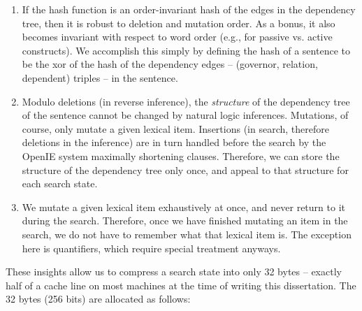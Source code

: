 \begin{enumerate}
  \item If the hash function is an order-invariant hash of the edges in the dependency tree,
        then it is robust to deletion and mutation order.
        As a bonus, it also becomes invariant with respect to word order (e.g., for passive vs. active
        constructs).
        We accomplish this simply by defining the hash of a sentence to be the xor of the hash of
        the dependency edges -- (governor, relation, dependent) triples -- in the sentence.

  \item Modulo deletions (in reverse inference), the \textit{structure} of the dependency 
        tree of the sentence cannot be changed by natural logic inferences.
        Mutations, of course, only mutate a given lexical item. Insertions (in search, therefore deletions
        in the inference) are in turn handled before the search by the OpenIE system maximally shortening
        clauses.
        Therefore, we can store the structure of the dependency tree only once, and appeal to that structure for
        each search state.

  \item We mutate a given lexical item exhaustively at once, and never return to it during the search.
        Therefore, once we have finished mutating an item in the search, we do not have to remember what
        that lexical item is.
        The exception here is quantifiers, which require special treatment anyways.
\end{enumerate}

These insights allow us to compress a search state into only 32 bytes -- exactly half of a cache line
  on most machines at the time of writing this dissertation.
The 32 bytes (256 bits) are allocated as follows:

